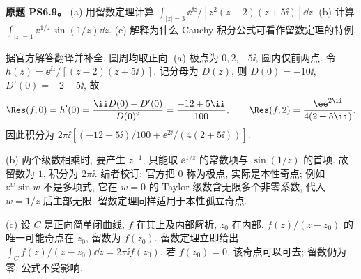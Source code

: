 \begin{exercise}
\textbf{原题 PS6.9。}\label{ass:ps6-9}
(a) 用留数定理计算 $\int_{|z|=3}\ee^{\ii z}/[z^2(z-2)(z+5\ii)]\dd z$.
(b) 计算 $\int_{|z|=1}\ee^{1/z}\sin(1/z)\dd z$.
(c) 解释为什么 Cauchy 积分公式可看作留数定理的特例.
\end{exercise}
\begin{solution}
据官方解答翻译并补全. 圆周均取正向.
(a) 极点为 $0,2,-5\ii$, 圆内仅前两点. 令 $h(z)=\ee^{\ii z}/[(z-2)(z+5\ii)]$. 记分母为 $D(z)$, 则 $D(0)=-10\ii$, $D'(0)=-2+5\ii$, 故
\[
 \Res(f,0)=h'(0)=\frac{\ii D(0)-D'(0)}{D(0)^2}
 =\frac{-12+5\ii}{100},\qquad
 \Res(f,2)=\frac{\ee^{2\ii}}{4(2+5\ii)}.
\]
因此积分为 $2\pi\ii[(-12+5\ii)/100+\ee^{2\ii}/(4(2+5\ii))]$.

(b) 两个级数相乘时, 要产生 $z^{-1}$, 只能取 $\ee^{1/z}$ 的常数项与 $\sin(1/z)$ 的首项. 故留数为 $1$, 积分为 $2\pi\ii$. 编者校订: 官方把 $0$ 称为极点, 实际是本性奇点; 例如 $\ee^w\sin w$ 不是多项式, 它在 $w=0$ 的 Taylor 级数含无限多个非零系数, 代入 $w=1/z$ 后主部无限. 留数定理同样适用于本性孤立奇点.

(c) 设 $C$ 是正向简单闭曲线, $f$ 在其上及内部解析, $z_0$ 在内部. $f(z)/(z-z_0)$ 的唯一可能奇点在 $z_0$, 留数为 $f(z_0)$. 留数定理立即给出 $\int_C f(z)/(z-z_0)\dd z=2\pi\ii f(z_0)$. 若 $f(z_0)=0$, 该奇点可以可去; 留数仍为零, 公式不受影响.
\end{solution}

